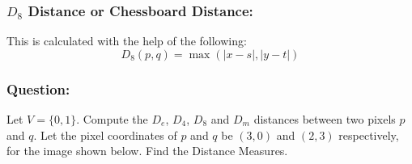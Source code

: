 \subsubsection{$D_8$ Distance or Chessboard Distance:}
This is calculated with the help of the following:
$$D_8(p,q) = \max (|x-s|, |y-t|)$$

\subsubsection{Question:}
Let $V = \{0,1\}$. Compute the $D_e$, $D_4$, $D_8$ and $D_m$ distances between two pixels $p$ and $q$. Let the pixel coordinates of $p$ and $q$ be $(3,0)$ and $(2,3)$ respectively, for the image shown below. Find the Distance Measures.

\begin{figure}[h]
    \centering


\end{figure}
